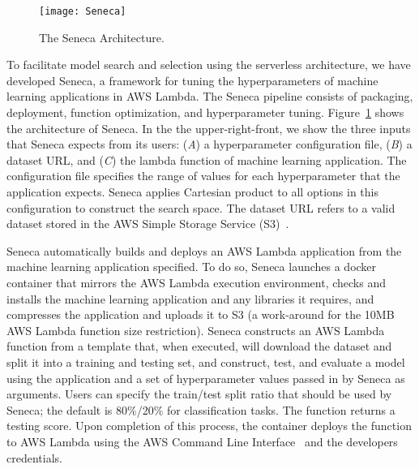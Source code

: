 \begin{figure}[t] \centering 
\texttt{[image: Seneca]}
\caption{The Seneca Architecture.
\label{fig:seneca}}
\vspace{-0.2in}
\end{figure}

To facilitate model search and selection using the serverless architecture, 
we have developed Seneca, 
a framework for tuning the hyperparameters of machine learning applications 
in AWS Lambda. 
The Seneca pipeline consists of packaging, deployment, 
function optimization, and hyperparameter tuning. Figure~\ref{fig:seneca} 
shows the architecture of Seneca.  In the the upper-right-front, we
show the three inputs that Seneca expects from its users: (\textit{A}) a hyperparameter
configuration file, (\textit{B}) a dataset URL, and (\textit{C}) the lambda function of machine learning application. The configuration file specifies the range of values for each hyperparameter that the application expects. Seneca applies Cartesian product to all options in this configuration to construct the search space. The dataset URL refers to a valid dataset stored in the AWS Simple Storage 
Service (S3)~\cite{ref:awss3}.

Seneca automatically builds and deploys an AWS Lambda application from the machine learning application specified.
To do so, Seneca launches a docker container that mirrors the
AWS Lambda execution environment, checks and installs
the machine learning application and any libraries it requires,
and compresses the application and uploads it to S3 (a work-around
for the 10MB AWS Lambda function size restriction).
Seneca constructs an AWS Lambda function from a template
that, when executed, will download the dataset and split it into a training and testing set, and construct, test, and evaluate a model using the application
and a set of hyperparameter values passed in by Seneca as arguments.
Users can specify the train/test split ratio that should be used by Seneca; the
default is 80\%/20\% for classification tasks.
The function returns a testing score. 
Upon completion of this process, the container deploys the function
to AWS Lambda using the
AWS Command Line Interface~\cite{ref:awscli}
and the developers credentials.



